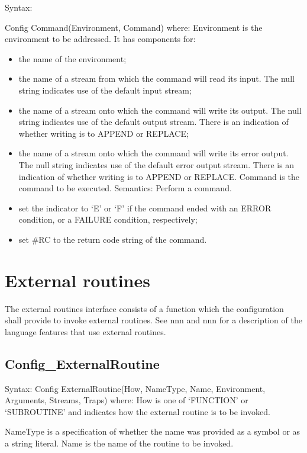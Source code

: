 Syntax:

Config Command(Environment, Command) where: Environment is the
environment to be addressed. It has components for:

\begin{itemize}
\item
  the name of the environment;
\item
  the name of a stream from which the command will read its input. The
  null string indicates use of the default input stream;
\item
  the name of a stream onto which the command will write its output. The
  null string indicates use of the default output stream. There is an
  indication of whether writing is to APPEND or REPLACE;
\item
  the name of a stream onto which the command will write its error
  output. The null string indicates use of the default error output
  stream. There is an indication of whether writing is to APPEND or
  REPLACE. Command is the command to be executed. Semantics: Perform a
  command.
\item
  set the indicator to `E' or `F' if the command ended with an ERROR
  condition, or a FAILURE condition, respectively;
\item
  set \#RC to the return code string of the command.
\end{itemize}

\hypertarget{external-routines}{%
\section{External routines}\label{external-routines}}

The external routines interface consists of a function which the
configuration shall provide to invoke external routines. See nnn and nnn
for a description of the language features that use external routines.

\hypertarget{config_externalroutine}{%
\subsection{Config\_ExternalRoutine}\label{config_externalroutine}}

Syntax: Config ExternalRoutine(How, NameType, Name, Environment,
Arguments, Streams, Traps) where: How is one of `FUNCTION' or
`SUBROUTINE' and indicates how the external routine is to be invoked.

NameType is a specification of whether the name was provided as a symbol
or as a string literal. Name is the name of the routine to be invoked.

